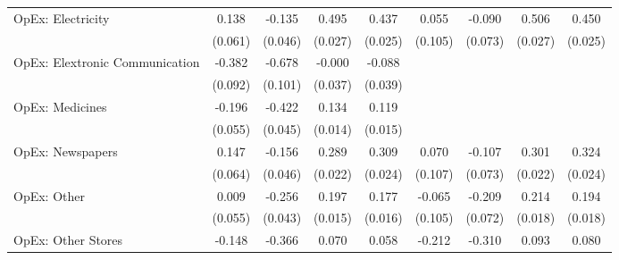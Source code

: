 {\begin{longtable}{l*{8}{c}}
OpEx: Electricity   &       0.138\sym{*}  &      -0.135\sym{**} &       0.495\sym{***}&       0.437\sym{***}&       0.055         &      -0.090         &       0.506\sym{***}&       0.450\sym{***}\\
                    &     (0.061)         &     (0.046)         &     (0.027)         &     (0.025)         &     (0.105)         &     (0.073)         &     (0.027)         &     (0.025)         \\
OpEx: Elextronic Communication&      -0.382\sym{***}&      -0.678\sym{***}&      -0.000         &      -0.088\sym{*}  &                     &                     &                     &                     \\
                    &     (0.092)         &     (0.101)         &     (0.037)         &     (0.039)         &                     &                     &                     &                     \\
OpEx: Medicines     &      -0.196\sym{***}&      -0.422\sym{***}&       0.134\sym{***}&       0.119\sym{***}&                     &                     &                     &                     \\
                    &     (0.055)         &     (0.045)         &     (0.014)         &     (0.015)         &                     &                     &                     &                     \\
OpEx: Newspapers    &       0.147\sym{*}  &      -0.156\sym{***}&       0.289\sym{***}&       0.309\sym{***}&       0.070         &      -0.107         &       0.301\sym{***}&       0.324\sym{***}\\
                    &     (0.064)         &     (0.046)         &     (0.022)         &     (0.024)         &     (0.107)         &     (0.073)         &     (0.022)         &     (0.024)         \\
OpEx: Other         &       0.009         &      -0.256\sym{***}&       0.197\sym{***}&       0.177\sym{***}&      -0.065         &      -0.209\sym{**} &       0.214\sym{***}&       0.194\sym{***}\\
                    &     (0.055)         &     (0.043)         &     (0.015)         &     (0.016)         &     (0.105)         &     (0.072)         &     (0.018)         &     (0.018)         \\
OpEx: Other Stores  &      -0.148\sym{**} &      -0.366\sym{***}&       0.070\sym{***}&       0.058\sym{***}&      -0.212\sym{*}  &      -0.310\sym{***}&       0.093\sym{***}&       0.080\sym{***}\\

\end{longtable}}
